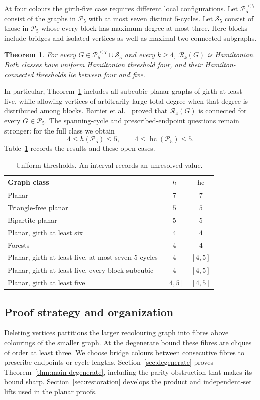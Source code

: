 \documentclass[11pt]{article}
\newtheorem{theorem}{Theorem}[section]
\theoremstyle{remark}
\newcommand{\R}{\mathcal R}
\newcommand{\Rk}{\mathcal R_k}
\newcommand{\hc}{\operatorname{hc}}
\numberwithin{equation}{section}
\numberwithin{table}{section}
\begin{document}
At four colours the girth-five case requires different local
configurations. Let $\mathcal P_5^{\le7}$ consist of the graphs in
$\mathcal P_5$ with at most seven distinct $5$-cycles. Let
$\mathcal S_5$ consist of those in $\mathcal P_5$ whose every block
has maximum degree at most three. Here blocks include bridges and
isolated vertices as well as maximal two-connected subgraphs.

\begin{theorem}\label{thm:main-four}
For every $G\in\mathcal P_5^{\le7}\cup\mathcal S_5$ and every $k\ge4$,
$\Rk(G)$ is Hamiltonian. Both classes have uniform Hamiltonian
threshold four, and their Hamilton-connected thresholds lie between
four and five.
\end{theorem}

In particular, Theorem~\ref{thm:main-four} includes all subcubic planar
graphs of girth at least five, while allowing vertices of arbitrarily
large total degree when that degree is distributed among blocks.
Bartier et al.~\cite{BBFHMP23} proved that $\R_4(G)$ is connected for
every $G\in\mathcal P_5$. The spanning-cycle and prescribed-endpoint
questions remain stronger: for the full class we obtain
\[
4\le h(\mathcal P_5)\le5,\qquad 4\le\hc(\mathcal P_5)\le5.
\]
Table~\ref{tab:thresholds} records the results and these open cases.

\begin{table}[htbp]
\centering\small
\caption{Uniform thresholds. An interval records an unresolved value.}
\label{tab:thresholds}
\begin{tabularx}{\linewidth}{@{}Xcc@{}}
\toprule
Graph class & $h$ & $\hc$\\
\midrule
Planar & $7$ & $7$\\
Triangle-free planar & $5$ & $5$\\
Bipartite planar & $5$ & $5$\\
Planar, girth at least six & $4$ & $4$\\
Forests & $4$ & $4$\\
Planar, girth at least five, at most seven $5$-cycles & $4$ & $[4,5]$\\
Planar, girth at least five, every block subcubic & $4$ & $[4,5]$\\
Planar, girth at least five & $[4,5]$ & $[4,5]$\\
\bottomrule
\end{tabularx}
\end{table}

\subsection{Proof strategy and organization}
Deleting vertices partitions the larger recolouring graph into fibres
above colourings of the smaller graph. At the degenerate bound these
fibres are cliques of order at least three. We choose bridge colours
between consecutive fibres to prescribe endpoints or cycle lengths.
Section~\ref{sec:degenerate} proves Theorem~\ref{thm:main-degenerate},
including the parity obstruction that makes its bound sharp.
Section~\ref{sec:restoration} develops the product and independent-set
lifts used in the planar proofs.
\end{document}
